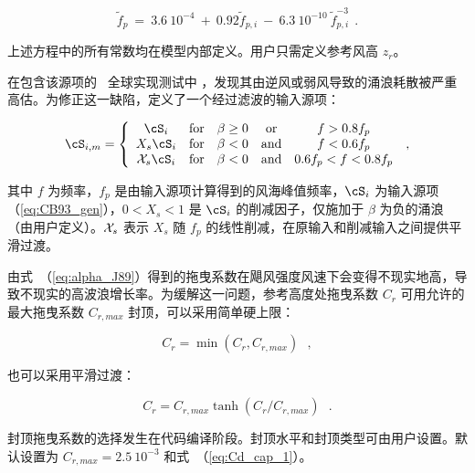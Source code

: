 
\begin{equation}
\tilde{f}_p \: = \: 3.6 \: 10^{-4} \: + \: 0.92 \tilde{f}_{p,i}
\: - \: 6.3 \: 10^{-10} \: \tilde{f}_{p,i}^{-3}
\:\: . \label{eq:fp_fpi} \end{equation}

\noindent
上述方程中的所有常数均在模型内部定义。用户只需定义参考风高 $z_r$。

在包含该源项的 \ws\ 全球实现测试中 \citep{tol:OMB02a}，发现其由逆风或弱风导致的涌浪耗散被严重高估。为修正这一缺陷，定义了一个经过滤波的输入源项：


\begin{equation}
\cS_{i,m} = \left \{ \begin{array}{ccccc}
    \cS_i         & \mbox{for} & \beta \geq 0 & \mbox{or}  & f > 0.8 f_p \\
  X_s \cS_i       & \mbox{for} & \beta < 0    & \mbox{and} & f < 0.6 f_p \\
{\cal{X}}_s \cS_i & \mbox{for} & \beta < 0    & \mbox{and} & 0.6 f_p < f < 0.8 f_p
\end{array} \right . \: , \label{eq:swellf} \end{equation}

\noindent
其中 $f$ 为频率，$f_p$ 是由输入源项计算得到的风海峰值频率，$\cS_i$ 为输入源项（\ref{eq:CB93_gen}），$0 < X_s < 1$ 是 $\cS_i$ 的削减因子，仅施加于 $\beta$ 为负的涌浪（由用户定义）。${\cal{X}}_s$ 表示 $X_s$ 随 $f_p$ 的线性削减，在原输入和削减输入之间提供平滑过渡。

由式~（\ref{eq:alpha_J89}）得到的拖曳系数在飓风强度风速下会变得不现实地高，导致不现实的高波浪增长率。为缓解这一问题，参考高度处拖曳系数 $C_r$ 可用允许的最大拖曳系数 $C_{r,max}$ 封顶，可以采用简单硬上限：

\begin{equation}
C_r = \min ( C_r , C_{r,max}) \:\:\: , \label{eq:Cd_cap_1}
\end{equation}

\noindent
也可以采用平滑过渡：

\begin{equation}
C_r = C_{r,max} \tanh ( C_r / C_{r,max} ) \:\:\: . \label{eq:Cd_cap_2}
\end{equation}

\noindent
封顶拖曳系数的选择发生在代码编译阶段。封顶水平和封顶类型可由用户设置。默认设置为 $C_{r,max} = 2.5 \:10^{-3}$ 和式~（\ref{eq:Cd_cap_1}）。



